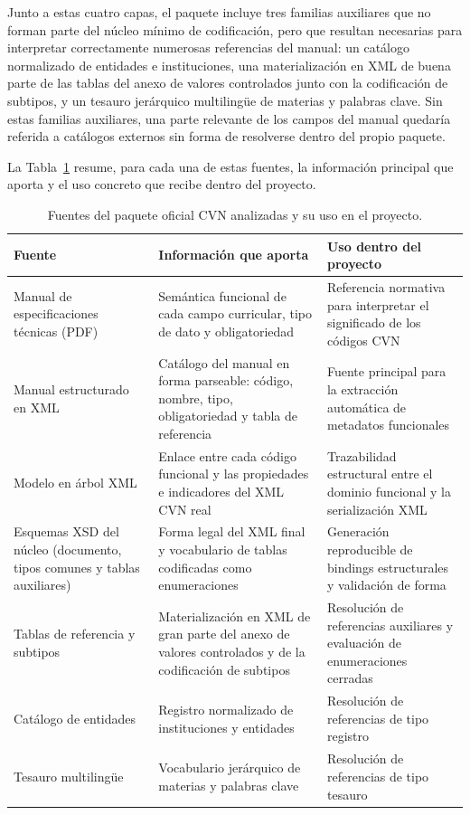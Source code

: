 Junto a estas cuatro capas, el paquete incluye tres familias auxiliares que no
forman parte del núcleo mínimo de codificación, pero que resultan necesarias
para interpretar correctamente numerosas referencias del manual: un catálogo
normalizado de entidades e instituciones, una materialización en XML de buena
parte de las tablas del anexo de valores controlados junto con la codificación
de subtipos, y un tesauro jerárquico multilingüe de materias y palabras clave.
Sin estas familias auxiliares, una parte relevante de los campos del manual
quedaría referida a catálogos externos sin forma de resolverse dentro del propio
paquete.

La Tabla~\ref{tab:ecosistema_fuentes} resume, para cada una de estas fuentes, la
información principal que aporta y el uso concreto que recibe dentro del
proyecto.

\begin{table}[htbp]
  \centering
  \footnotesize
  \renewcommand{\arraystretch}{1.55}
  \caption{Fuentes del paquete oficial CVN analizadas y su uso en el proyecto.}
  \label{tab:ecosistema_fuentes}
  \begin{tabular}{p{} p{} p{}}
    \hline
    \textbf{Fuente} & \textbf{Información que aporta} & \textbf{Uso dentro del proyecto} \\
    \hline
    Manual de especificaciones técnicas (PDF) & Semántica funcional de cada campo curricular, tipo de dato y obligatoriedad & Referencia normativa para interpretar el significado de los códigos CVN \\
    Manual estructurado en XML & Catálogo del manual en forma parseable: código, nombre, tipo, obligatoriedad y tabla de referencia & Fuente principal para la extracción automática de metadatos funcionales \\
    Modelo en árbol XML & Enlace entre cada código funcional y las propiedades e indicadores del XML CVN real & Trazabilidad estructural entre el dominio funcional y la serialización XML \\
    Esquemas XSD del núcleo (documento, tipos comunes y tablas auxiliares) & Forma legal del XML final y vocabulario de tablas codificadas como enumeraciones & Generación reproducible de bindings estructurales y validación de forma \\
    Tablas de referencia y subtipos & Materialización en XML de gran parte del anexo de valores controlados y de la codificación de subtipos & Resolución de referencias auxiliares y evaluación de enumeraciones cerradas \\
    Catálogo de entidades & Registro normalizado de instituciones y entidades & Resolución de referencias de tipo registro \\
    Tesauro multilingüe & Vocabulario jerárquico de materias y palabras clave & Resolución de referencias de tipo tesauro \\
    \hline
  \end{tabular}
\end{table}

